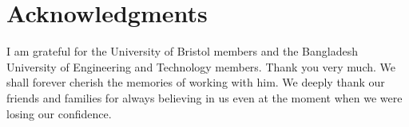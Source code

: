 \chapter*{Acknowledgments}
I am grateful for the University of Bristol members and the Bangladesh University of Engineering and Technology members. Thank you very much. We shall forever cherish the memories of working with him. We deeply thank our friends and families for always believing in us even at the moment when we were losing our confidence.
\clearpage